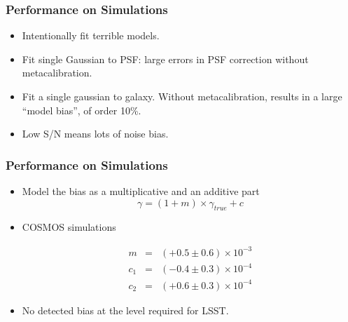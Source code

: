 \documentclass{beamer}
\newcommand{\mcal}{metacalibration}
\begin{document}
\frame
{
    \frametitle{Performance on Simulations}

 
    \begin{itemize}
        \item Intentionally fit terrible models.

        \item Fit single Gaussian to PSF: large errors in
            PSF correction without \mcal.

        \item Fit a single gaussian to galaxy.  Without
            \mcal, results in a large ``model bias'', of order 10\%.
            
        \item Low S/N means lots of noise bias.

    \end{itemize}
}

\frame
{
    \frametitle{Performance on Simulations}

 
    \begin{itemize}
            
            
         \item Model the bias as a multiplicative and an additive part
        {\color{lightskyblue} 
            \begin{equation}
                \gamma = (1 + m ) \times \gamma_{true} + c \nonumber
            \end{equation}
        }


         \item COSMOS simulations

        {\color{gold} 
            \begin{eqnarray}
                m & = & (+0.5 \pm 0.6) \times 10^{-3} \nonumber \\
              c_1 & = & (-0.4 \pm 0.3) \times 10^{-4} \nonumber \\
              c_2 & = & (+0.6 \pm 0.3) \times 10^{-4} \nonumber
            \end{eqnarray}
        }
         \item No detected bias at the level required for LSST.

    \end{itemize}

}
\end{document}
